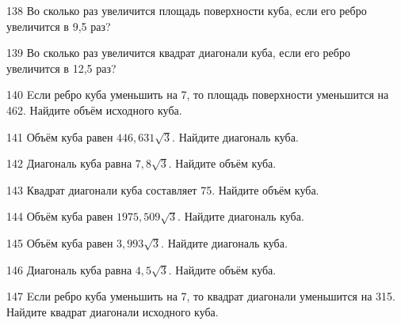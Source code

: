 \begin{taskBN}{138}
Во сколько раз увеличится площадь поверхности куба, если его ребро увеличится в 9,5 раз?
\end{taskBN}

\begin{taskBN}{139}
Во сколько раз увеличится квадрат диагонали куба, если его ребро увеличится в 12,5 раз?
\end{taskBN}

\begin{taskBN}{140}
Eсли ребро куба уменьшить на 7, то площадь поверхности уменьшится на 462. Найдите объём исходного куба.
\end{taskBN}

\begin{taskBN}{141}
Объём куба равен $446,631\sqrt{3}$. Найдите диагональ куба.
\end{taskBN}

\begin{taskBN}{142}
Диагональ куба равна $7,8\sqrt{3}$. Найдите объём куба.
\end{taskBN}

\begin{taskBN}{143}
Квадрат диагонали куба составляет 75. Найдите объём куба.
\end{taskBN}

\begin{taskBN}{144}
Объём куба равен $1975,509\sqrt{3}$. Найдите диагональ куба.
\end{taskBN}

\begin{taskBN}{145}
Объём куба равен $3,993\sqrt{3}$. Найдите диагональ куба.
\end{taskBN}

\begin{taskBN}{146}
Диагональ куба равна $4,5\sqrt{3}$. Найдите объём куба.
\end{taskBN}

\begin{taskBN}{147}
Eсли ребро куба уменьшить на 7, то квадрат диагонали уменьшится на 315. Найдите квадрат диагонали исходного куба.
\end{taskBN}

